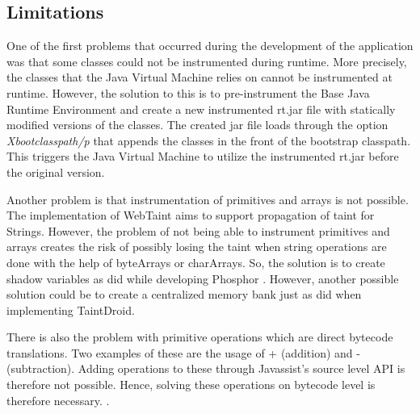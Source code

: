 \subsection{Limitations}
\label{NotableProblems}
One of the first problems that occurred during the development of the application was that some classes could not be instrumented during runtime. More precisely, the classes that the Java Virtual Machine relies on cannot be instrumented at runtime. However, the solution to this is to pre-instrument the Base Java Runtime Environment and create a new instrumented rt.jar file with statically modified versions of the classes. The created jar file loads through the option \textit{Xbootclasspath/p} \parencite{xboot} that appends the classes in the front of the bootstrap classpath. This triggers the Java Virtual Machine to utilize the instrumented rt.jar before the original version.

Another problem is that instrumentation of primitives and arrays is not possible. The implementation of WebTaint aims to support propagation of taint for Strings. However, the problem of not being able to instrument primitives and arrays creates the risk of possibly losing the taint when string operations are done with the help of byteArrays or charArrays. So, the solution is to create shadow variables as \textcite{BellJ.2014PIdd} did while developing Phosphor \parencite{phosphor}. However, another possible solution could be to create a centralized memory bank just as \textcite{EnckWilliam2014Taif} did when implementing TaintDroid.

There is also the problem with primitive operations which are direct bytecode translations. Two examples of these are the usage of + (addition) and - (subtraction). Adding operations to these through Javassist's source level API is therefore not possible. Hence, solving these operations on bytecode level is therefore necessary. \parencite{Javassist}.